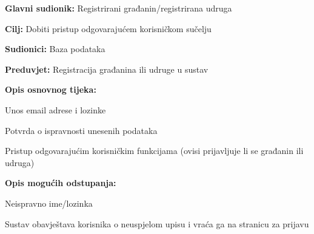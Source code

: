 		
		
			\noindent {}
			\begin{packed_item}
				
				\item \textbf{Glavni sudionik:} Registrirani građanin/registrirana udruga
				\item  \textbf{Cilj:} Dobiti pristup odgovarajućem korisničkom sučelju
				\item  \textbf{Sudionici:} Baza podataka
				\item  \textbf{Preduvjet:} Registracija građanina ili udruge u sustav
				\item  \textbf{Opis osnovnog tijeka:}
				
				\item[] \begin{packed_enum}
					
					\item Unos email adrese i lozinke
					\item Potvrda o ispravnosti unesenih podataka
					\item Pristup odgovarajućim korisničkim funkcijama (ovisi prijavljuje li se građanin ili udruga)
				\end{packed_enum}
				
				\item  \textbf{Opis mogućih odstupanja:}
				
				\item[] \begin{packed_item}
					
					\item [2.a] Neispravno ime/lozinka
					\item[] \begin{packed_enum}
						
						\item Sustav obavještava korisnika o neuspjelom upisu i vraća ga na stranicu za prijavu
						
					\end{packed_enum}
				\end{packed_item}
			\end{packed_item}
		
